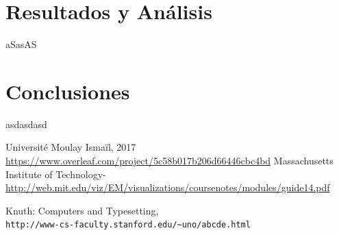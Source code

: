 \documentclass[%
 reprint,
 amsmath,amssymb,
 aps,
]{revtex4-1}
\begin{document}
\section{Resultados y Análisis}

aSasAS

\section{Conclusiones}
asdasdasd

\begin{thebibliography}{9}
Université Moulay Ismaïl, 2017
\url{https://www.overleaf.com/project/5c58b017b206d66446cbc4bd}
Massachusetts Institute of Technology-
\url{http://web.mit.edu/viz/EM/visualizations/coursenotes/modules/guide14.pdf}
 
Knuth: Computers and Typesetting,
\\\texttt{http://www-cs-faculty.stanford.edu/\~{}uno/abcde.html}

\end{thebibliography}
\end{document}
